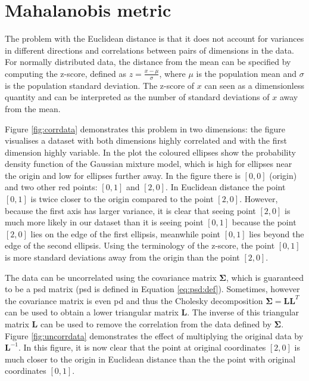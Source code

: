 \documentclass[12pt,a4paper]{report}
\begin{document}

\section{Mahalanobis metric} \label{chap:intro:mah}

The problem with the Euclidean distance is that it does not account for variances in different directions and correlations between pairs of dimensions in the data. For normally distributed data, the distance from the mean can be specified by computing the z-score, defined as $z = \frac{x-\mu}{\sigma}$, where $\mu$ is the population mean and $\sigma$ is the population standard deviation. The z-score of $x$ can seen as a dimensionless quantity and can be interpreted as the number of standard deviations of $x$ away from the mean.

Figure \ref{fig:corrdata} demonstrates this problem in two dimensions: the figure visualises a dataset with both dimensions highly correlated and with the first dimension highly variable. In the plot the coloured ellipses show the probability density function of the Gaussian mixture model, which is high for ellipses near the origin and low for ellipses further away. In the figure there is $[0,0]$ (origin) and two other red points: $[0,1]$ and $[2,0]$. In Euclidean distance the point $[0,1]$ is twice closer to the origin compared to the point $[2,0]$. However, because the first axis has larger variance, it is clear that seeing point $[2,0]$ is much more likely in our dataset than it is seeing point $[0,1]$ because the point $[2,0]$ lies on the edge of the first ellipsis, meanwhile point $[0,1]$ lies beyond the edge of the second ellipsis. Using the terminology of the z-score, the point $[0,1]$ is more standard deviations away from the origin than the point $[2,0]$.


The data can be uncorrelated using the covariance matrix $\bm{\Sigma}$, which is guaranteed to be a \ac{psd} matrix (\ac{psd} is defined in Equation \ref{eq:psd:def}). Sometimes, however the covariance matrix is even \ac{pd} and thus the Cholesky decomposition $\bm{\Sigma}=\bm{L}\bm{L}^T$ can be used to obtain a lower triangular matrix $\bm{L}$. The inverse of this triangular matrix $\bm{L}$ can be used to remove the correlation from the data defined by $\bm{\Sigma}$. Figure \ref{fig:uncorrdata} demonstrates the effect of multiplying the original data by $\bm{L}^{-1}$. In this figure, it is now clear that the point at original coordinates $[2,0]$ is much closer to the origin in Euclidean distance than the the point with original coordinates $[0,1]$.
\end{document}

